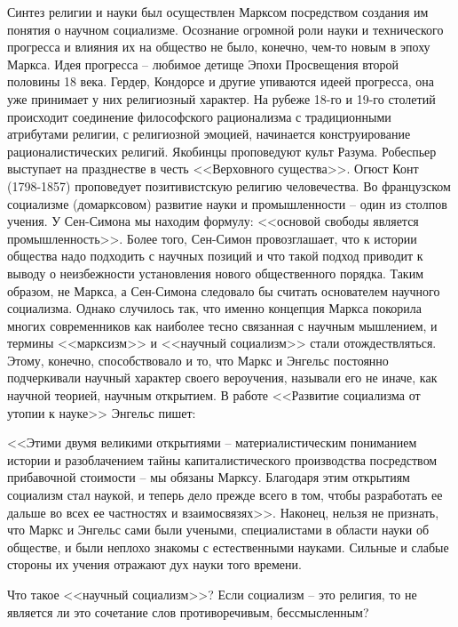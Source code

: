 \documentclass{book}
\begin{document}
Синтез религии и науки был осуществлен Марксом посред­ством создания им понятия о научном социализме.  Осознание огромной роли науки и технического прогресса и влияния их на общество не было, конечно, чем-то новым в эпоху Маркса. Идея прогресса -- любимое детище Эпохи Просвещения второй половины 18 века. Гердер, Кондорсе и другие упиваются идеей прогресса, она уже принимает у них религиозный характер. На рубеже 18-го и 19-го столетий происходит соединение философского рационализма с традиционными атрибутами религии, с религиозной эмоцией, начинается конструирование рационалистических религий. Якобинцы проповедуют культ Разума. Робеспьер выступает на празднестве в честь <<Верховного существа>>. Огюст Конт (1798-1857) проповедует позитивистскую религию человечества. Во французском социализме (домарксовом) развитие науки и промышленности -- один из столпов учения. У Сен-Симона мы находим формулу: <<основой свободы является промышленность>>. Более того, Сен-Симон провозглашает, что к истории общества надо 
подходить 
с научных позиций и что такой подход приводит к выводу о неизбежности установления нового общественного порядка. Таким образом, не Маркса, а Сен-Симона следовало бы считать основателем научного социализма. Однако случилось так, что именно концепция Маркса покорила многих современников как наиболее тесно связанная с научным мышлением, и термины <<марксизм>> и <<научный социализм>> стали отождествляться. Этому, конечно, способствовало и то, что Маркс и Энгельс постоянно подчеркивали научный характер своего вероучения, называли его не иначе, как научной теорией, научным открытием. В работе <<Развитие социализма от утопии к науке>> Энгельс пишет:

<<Этими двумя великими открытиями -- материалистическим пониманием истории и разоблачением тайны капиталистиче­ского производства посредством прибавочной стоимости -- мы обязаны Марксу. Благодаря этим открытиям социализм стал наукой,  и теперь дело прежде всего в том, чтобы разработать ее дальше во всех ее частностях и взаимосвязях>>. Наконец, нельзя не признать, что Маркс и Энгельс сами были учеными, специалистами в области науки об обществе, и были неплохо знакомы с естественными науками. Сильные и слабые стороны их учения отражают дух науки того времени.

Что такое <<научный социализм>>? Если социализм -- это ре­лигия, то не является ли это сочетание слов противоречивым, бессмысленным?
\end{document}
